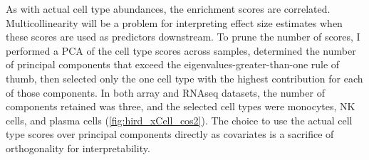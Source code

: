 As with actual cell type abundances, the enrichment scores are correlated.
Multicollinearity will be a problem for interpreting effect size estimates when these scores are used as predictors downstream.
To prune the number of scores, I performed a \gls{PCA} of the cell type scores across samples,
determined the number of principal components that exceed the eigenvalues-greater-than-one rule of thumb\autocite{kanyongo2005InfluenceReliabilityFour},
then selected only the one cell type with the highest contribution for each of those components.
In both array and \gls{RNAseq} datasets, the number of components retained was three, and the selected cell types were monocytes, \gls{NK} cells, and plasma cells (\autoref{fig:hird_xCell_cos2}).
The choice to use the actual cell type scores over principal components directly as covariates is a sacrifice of orthogonality for interpretability.

